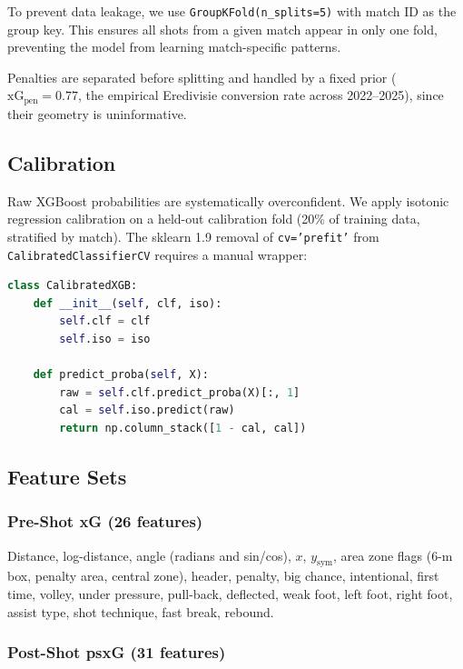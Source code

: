 \documentclass[12pt,a4paper]{article}
\begin{document}
To prevent data leakage, we use \texttt{GroupKFold(n\_splits=5)} with match ID as the group key. This ensures all shots from a given match appear in only one fold, preventing the model from learning match-specific patterns.

Penalties are separated before splitting and handled by a fixed prior ($\text{xG}_\text{pen} = 0.77$, the empirical Eredivisie conversion rate across 2022--2025), since their geometry is uninformative.

\subsection{Calibration}

Raw XGBoost probabilities are systematically overconfident. We apply isotonic regression calibration on a held-out calibration fold (20\% of training data, stratified by match). The sklearn 1.9 removal of \texttt{cv='prefit'} from \texttt{CalibratedClassifierCV} requires a manual wrapper:

\begin{lstlisting}[language=Python]
class CalibratedXGB:
    def __init__(self, clf, iso):
        self.clf = clf
        self.iso = iso

    def predict_proba(self, X):
        raw = self.clf.predict_proba(X)[:, 1]
        cal = self.iso.predict(raw)
        return np.column_stack([1 - cal, cal])
\end{lstlisting}

\subsection{Feature Sets}

\subsubsection{Pre-Shot xG (26 features)}

Distance, log-distance, angle (radians and sin/cos), $x$, $y_\text{sym}$, area zone flags (6-m box, penalty area, central zone), header, penalty, big chance, intentional, first time, volley, under pressure, pull-back, deflected, weak foot, left foot, right foot, assist type, shot technique, fast break, rebound.

\subsubsection{Post-Shot psxG (31 features)}
\end{document}
